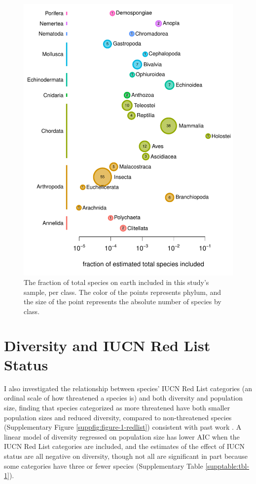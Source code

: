 \documentclass[11pt]{article}
\begin{document}
\begin{figure}[!htb]
  \centering
  \includegraphics[]{figures/species_counts.pdf}
  \caption{The fraction of total species on earth included in this study's
  sample, per class. The color of the points represents phylum, and the size of
the point represents the absolute number of species by class.}
  \label{suppfig:species_counts}
\end{figure}


\section{Diversity and IUCN Red List Status}
\label{supinfo:div-iucn}

I also investigated the relationship between species' IUCN Red List categories
(an ordinal scale of how threatened a species is) and both diversity and
population size, finding that species categorized as more threatened have both
smaller population sizes and reduced diversity, compared to non-threatened
species (Supplementary Figure \ref{suppfig:figure-1-redlist}) consistent with
past work \parencite{Spielman2004-mt}. A linear model of diversity regressed on
population size has lower AIC when the IUCN Red List categories are included,
and the estimates of the effect of IUCN status are all negative on diversity,
though not all are significant in part because some categories have three or
fewer species (Supplementary Table \ref{supptable:tbl-1}).
\end{document}
